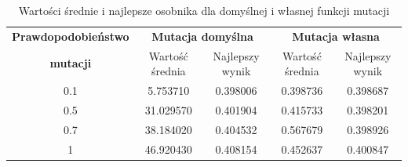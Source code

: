 \begin{table}[!h]
	\hspace*{-1.5in}
	\centering
	\caption{Wartości średnie i najlepsze osobnika dla domyślnej i własnej funkcji mutacji}
	\label{mut_porownanie}
	\hspace*{-0.4in}
	\begin{tabular}{|c|c|c|c|c|}
		\hline
		\textbf{Prawdopodobieństwo} & \multicolumn{2}{c}{\textbf{Mutacja domyślna}}  & \multicolumn{2}{|c|}{\textbf{Mutacja własna}} \\ \cline{2-5}
		\textbf{mutacji} & Wartość średnia & Najlepszy wynik & Wartość średnia & Najlepszy wynik \\ \hline
		
		0.1 & 5.753710  & 0.398006 & 0.398736 & 0.398687 \\
		0.5 & 31.029570 & 0.401904 & 0.415733 & 0.398201 \\
		0.7 & 38.184020 & 0.404532 & 0.567679 & 0.398926 \\
		1   & 46.920430 & 0.408154 & 0.452637 & 0.400847  \\ \hline      
	\end{tabular}
\end{table}